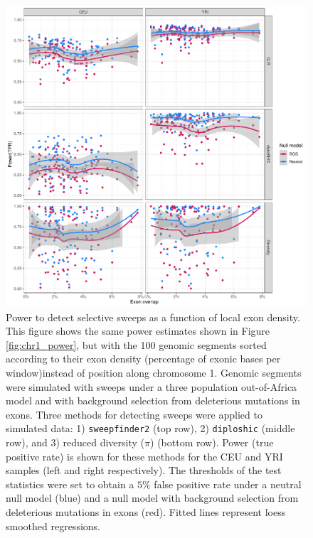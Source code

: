 \documentclass[hidelinks]{article}
\newcommand{\sweepfinder}{\texttt{sweepfinder2}\xspace}
\newcommand{\diploshic}{\texttt{diploshic}\xspace}
\begin{document}
\begin{figure}
    \centering
    \includegraphics[width=0.8 \textwidth]{figures/sweeps/relationship_power_exon.pdf}
    \caption{
        Power to detect selective sweeps as a function of local exon density.
        This figure shows the same power estimates shown in Figure \ref{fig:chr1_power},
        but with the 100 genomic segments sorted according to their
        exon density (percentage of exonic bases per window)instead of position along chromosome 1.
	    Genomic segments were simulated with sweeps under a three population out-of-Africa model
        \citep{gutenkunst2009inferring} and with background selection from deleterious mutations in exons.
        Three methods for detecting sweeps were applied to simulated data:
        1) \sweepfinder \citep{degiorgio2016sweepfinder2} (top row),
        2) \diploshic \citep{kern2018diplos} (middle row),
        and 3) reduced diversity ($\pi$) (bottom row).
        Power (true positive rate) is shown for these methods for the CEU and YRI
        samples (left and right respectively).
        The thresholds of the test statistics were set to obtain a
        $5\%$ false positive rate under a neutral null model (blue)
        and a null model with background selection from deleterious mutations in exons (red).
        Fitted lines represent loess smoothed regressions.
    }
    \label{fig:power-exon}
\end{figure}
\end{document}
